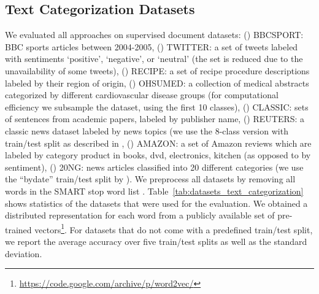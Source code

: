 \documentclass[twoside]{article}
\begin{document}
\subsection{Text Categorization Datasets}
We evaluated all approaches on  supervised document datasets: 
() BBCSPORT: BBC sports articles between 2004-2005, () TWITTER: a set of tweets labeled with sentiments ‘positive’, ‘negative’, or ‘neutral’ (the set is reduced due to the unavailability of some tweets), () RECIPE: a set of recipe procedure descriptions labeled by their region of origin, () OHSUMED: a collection of medical abstracts categorized by different cardiovascular disease groups (for computational efficiency we subsample the dataset, using the first 10 classes), () CLASSIC: sets of sentences from academic papers, labeled by publisher name, () REUTERS: a classic news dataset labeled by news topics (we use the 8-class version with train/test split as described in \cite{cachopo2007improving}, () AMAZON: a set of Amazon reviews which are labeled by category product in {books, dvd, electronics, kitchen} (as opposed to by sentiment), () 20NG: news articles classified into 20 different categories (we use the “bydate” train/test split by \cite{cachopo2007improving}).
We preprocess all datasets by removing all words in the SMART stop word list \citep{salton1971smart}.
Table~\ref{tab:datasets_text_categorization} shows statistics of the  datasets that were used for the evaluation.
We obtained a distributed representation for each word from a publicly available set of pre-trained vectors\footnote{\url{https://code.google.com/archive/p/word2vec/}}.
For datasets that do not come with a predefined train/test split, we report the average accuracy over five  train/test splits as well as the standard deviation.

\begin{table}[t]
\centering
\caption{Datasets used in text categorization experiments.}
\label{tab:datasets_text_categorization}
\end{table}
\end{document}
